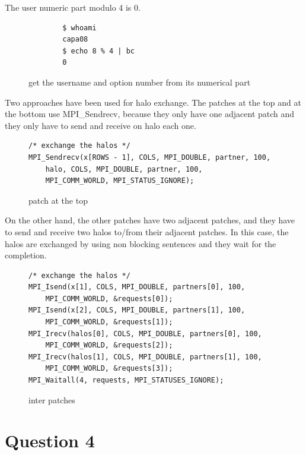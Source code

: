 \documentclass[12pt]{article}
\begin{document}
The user numeric part modulo 4 is 0.

\begin{figure}[h!]
	\begin{verbatim}
		$ whoami 
		capa08
		$ echo 8 % 4 | bc
		0
	\end{verbatim}
	\caption{get the username and option number from its numerical part}\label{code:user}
\end{figure}

Two approaches have been used for halo exchange.
The patches at the top and at the bottom use MPI\_Sendrecv, because they only have one adjacent patch and they only have to send and receive on halo each one.
\begin{figure}[h!]
	\begin{verbatim}
/* exchange the halos */
MPI_Sendrecv(x[ROWS - 1], COLS, MPI_DOUBLE, partner, 100,
	halo, COLS, MPI_DOUBLE, partner, 100,
	MPI_COMM_WORLD, MPI_STATUS_IGNORE);
	\end{verbatim}
	\caption{patch at the top}\label{code:extrem}
\end{figure}

\newpage

On the other hand, the other patches have two adjacent patches, and they have to send and receive two halos to/from their adjacent patches. In this case, the halos are exchanged by using non blocking sentences and they wait for the completion. 

\begin{figure}[h!]
	\begin{verbatim}
/* exchange the halos */
MPI_Isend(x[1], COLS, MPI_DOUBLE, partners[0], 100,
	MPI_COMM_WORLD, &requests[0]);
MPI_Isend(x[2], COLS, MPI_DOUBLE, partners[1], 100,
	MPI_COMM_WORLD, &requests[1]);
MPI_Irecv(halos[0], COLS, MPI_DOUBLE, partners[0], 100,
	MPI_COMM_WORLD, &requests[2]);
MPI_Irecv(halos[1], COLS, MPI_DOUBLE, partners[1], 100,
	MPI_COMM_WORLD, &requests[3]);
MPI_Waitall(4, requests, MPI_STATUSES_IGNORE);
	\end{verbatim}
\caption{inter patches}\label{code:inter}
\end{figure}

\section*{Question 4}
\end{document}
